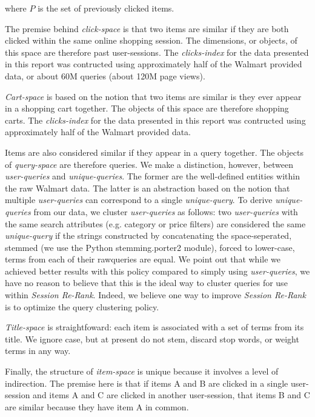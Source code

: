 where $P$ is the set of previously clicked items. 

The premise behind {\em click-space} is that two items are similar if they are both clicked within the same online shopping session. The dimensions, or objects, of this space are therefore past user-sessions. The {\em clicks-index} for the data presented in this report was contructed using approximately half of the Walmart provided data, or about 60M queries (about 120M page views).

{\em Cart-space} is based on the notion that two items are similar is they ever appear in a shopping cart together. The objects of this space are therefore shopping carts. The {\em clicks-index} for the data presented in this report was contructed using approximately half of the Walmart provided data.

Items are also considered similar if they appear in a query together. The objects of {\em query-space} are therefore queries. We make a distinction, however, between {\em user-queries} and {\em unique-queries}. The former are the well-defined entities within the raw Walmart data. The latter is an abstraction based on the notion that multiple {\em user-queries} can correspond to a single {\em unique-query}. To derive {\em unique-queries} from our data, we cluster {\em user-queries} as follows: two {\em user-queries} with the same search attributes (e.g. category or price filters) are considered the same {\em unique-query} if the strings constructed by concatenating the space-seperated, stemmed (we use the Python stemming.porter2 module), forced to lower-case, terms from each of their rawqueries are equal. We point out that while we achieved better results with this policy compared to simply using {\em user-queries}, we have no reason to believe that this is the ideal way to cluster queries for use within {\em Session Re-Rank}. Indeed, we believe one way to improve {\em Session Re-Rank} is to optimize the query clustering policy.

{\em Title-space} is straightfoward: each item is associated with a set of terms from its title. We ignore case, but at present do not stem, discard stop words, or weight terms in any way. 

Finally, the structure of {\em item-space} is unique because it involves a level of indirection. The premise here is that if items A and B are clicked in a single user-session and items A and C are clicked in another user-session, that items B and C are similar because they have item A in common.

